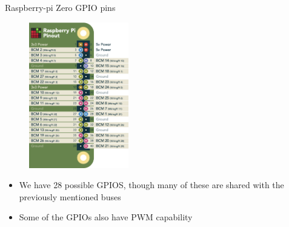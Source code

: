 \begin{frame}
   {Raspberry-pi Zero GPIO pins}
   \begin{figure}[H]
      \centering
      \includegraphics[height=2.5in]{IMAGES/rpi-pins-gpio}
   \end{figure}
   \begin{itemize}
      \item We have 28 possible GPIOS, though many of these are shared with
	      the previously mentioned buses
      \item Some of the GPIOs also have PWM capability
   \end{itemize}
\end{frame}

\cprotect{}

